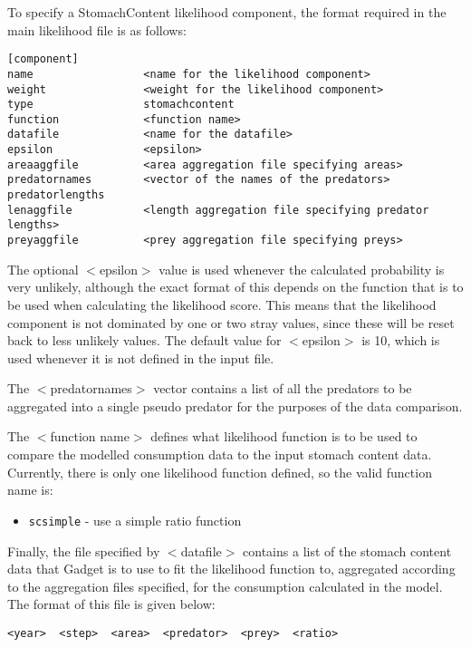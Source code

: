 \documentclass[]{book}
\providecommand{\tightlist}{%
  \setlength{\itemsep}{0pt}\setlength{\parskip}{0pt}}
\begin{document}
To specify a StomachContent likelihood component, the format required in
the main likelihood file is as follows:

\begin{verbatim}
[component]
name                 <name for the likelihood component>
weight               <weight for the likelihood component>
type                 stomachcontent
function             <function name>
datafile             <name for the datafile>
epsilon              <epsilon>
areaaggfile          <area aggregation file specifying areas>
predatornames        <vector of the names of the predators>
predatorlengths
lenaggfile           <length aggregation file specifying predator lengths>
preyaggfile          <prey aggregation file specifying preys>
\end{verbatim}

The optional \(<\)epsilon\(>\) value is used whenever the calculated
probability is very unlikely, although the exact format of this depends
on the function that is to be used when calculating the likelihood
score. This means that the likelihood component is not dominated by one
or two stray values, since these will be reset back to less unlikely
values. The default value for \(<\)epsilon\(>\) is 10, which is used
whenever it is not defined in the input file.

The \(<\)predatornames\(>\) vector contains a list of all the predators to
be aggregated into a single pseudo predator for the purposes of the data
comparison.

The \(<\)function name\(>\) defines what likelihood function is to be used
to compare the modelled consumption data to the input stomach content
data. Currently, there is only one likelihood function defined, so the
valid function name is:

\begin{itemize}
\tightlist
\item
  \texttt{scsimple} - use a simple ratio function
\end{itemize}

Finally, the file specified by \(<\)datafile\(>\) contains a list of the
stomach content data that Gadget is to use to fit the likelihood
function to, aggregated according to the aggregation files specified,
for the consumption calculated in the model. The format of this file is
given below:

\begin{verbatim}
<year>  <step>  <area>  <predator>  <prey>  <ratio>
\end{verbatim}
\end{document}

